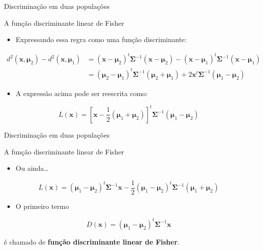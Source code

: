 \documentclass[
  ignorenonframetext,
  aspectratio=169,
]{beamer}
\providecommand{\tightlist}{%
  \setlength{\itemsep}{0pt}\setlength{\parskip}{0pt}}
\begin{document}
\begin{frame}{Discriminação em duas populações}
\label{discriminauxe7uxe3o-em-duas-populauxe7uxf5es-2}
\begin{block}{A função discriminante linear de Fisher}
\label{a-funuxe7uxe3o-discriminante-linear-de-fisher-2}
\begin{itemize}
\tightlist
\item
  Expressando essa regra como uma função discriminante:
\end{itemize}

\[
\begin{aligned}
d^2(\boldsymbol{x}, \boldsymbol{\mu}_2) - d^2(\boldsymbol{x}, \boldsymbol{\mu}_1) &= (\boldsymbol{x} - \boldsymbol{\mu}_2)^t \boldsymbol{\Sigma}^{-1}(\boldsymbol{x} - \boldsymbol{\mu}_2) - (\boldsymbol{x} - \boldsymbol{\mu}_1)^t \boldsymbol{\Sigma}^{-1}(\boldsymbol{x} - \boldsymbol{\mu}_1) 
\\  &= (\boldsymbol{\mu}_2 - \boldsymbol{\mu}_1)^t \boldsymbol{\Sigma}^{-1}(\boldsymbol{\mu}_2 + \boldsymbol{\mu}_1) + 2 \boldsymbol{x}^t\boldsymbol{\Sigma}^{-1}(\boldsymbol{\mu}_1 - \boldsymbol{\mu}_2)
\end{aligned}
\]

\begin{itemize}
\tightlist
\item
  A expressão acima pode ser reescrita como:
\end{itemize}

\[ L(\boldsymbol{x}) = \left[ \boldsymbol{x} - \displaystyle{\frac{1}{2}(\boldsymbol{\mu}_1 + \boldsymbol{\mu}_2)} \right]^t \boldsymbol{\Sigma}^{-1}(\boldsymbol{\mu}_1 - \boldsymbol{\mu}_2)\]
\end{block}
\end{frame}

\begin{frame}{Discriminação em duas populações}
\label{discriminauxe7uxe3o-em-duas-populauxe7uxf5es-3}
\begin{block}{A função discriminante linear de Fisher}
\label{a-funuxe7uxe3o-discriminante-linear-de-fisher-3}
\begin{itemize}
\tightlist
\item
  Ou ainda\ldots{}
\end{itemize}

\[
L(\boldsymbol{x}) = (\boldsymbol{\mu}_1 - \boldsymbol{\mu}_2)^t\boldsymbol{\Sigma}^{-1}\boldsymbol{x} - \displaystyle{\frac{1}{2}(\boldsymbol{\mu}_1 - \boldsymbol{\mu}_2)^t \boldsymbol{\Sigma}^{-1}(\boldsymbol{\mu}_1 + \boldsymbol{\mu}_2)}
\]

\begin{itemize}
\tightlist
\item
  O primeiro termo
\end{itemize}

\[D(\boldsymbol{x}) = (\boldsymbol{\mu}_1 - \boldsymbol{\mu}_2)^t \boldsymbol{\Sigma}^{-1}\boldsymbol{x}\]

é chamado de \textbf{função discriminante linear de Fisher}.
\end{block}
\end{frame}
\end{document}
